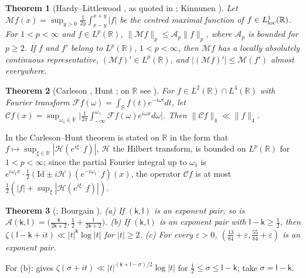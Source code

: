 \documentclass[preprint,12pt]{elsarticle}
\numberwithin{equation}{section}
\theoremstyle{plain}
\newtheorem{theorem}{Theorem}[section]
\theoremstyle{definition}
\theoremstyle{remark}
\newcommand{\R}{\mathbb R}
\begin{document}
\begin{theorem}[Hardy--Littlewood {\cite[Thm.~I.1]{Stein1970}}, as quoted in {\cite[(1.2)]{Kinnunen1997}}; Kinnunen {\cite[Thm.~1.4]{Kinnunen1997}}]\label{thm:known_maximal}
Let $\mathcal Mf(x)=\sup_{y>0}\frac1{2y}\int_{x-y}^{x+y}|f|$ be the centred maximal function of $f\in L^1_{\rm loc}(\R)$. For $1<p<\infty$ and $f\in L^p(\R)$, $\|\mathcal Mf\|_p\le\mathcal A_p\|f\|_p$, where $\mathcal A_p$ is bounded for $p\ge2$. If $f$ and $f'$ belong to $L^p(\R)$, $1<p<\infty$, then $\mathcal Mf$ has a locally absolutely continuous representative, $(\mathcal Mf)'\in L^p(\R)$, and $|(\mathcal Mf)'|\le\mathcal M(f')$ almost everywhere.
\end{theorem}

\begin{theorem}[Carleson {\cite{Carleson1966}}, Hunt {\cite{Hunt1968}}; on $\R$ see {\cite[(1.1) and p.~1]{DiPlinioLerner2014}}]\label{thm:known_carleson}
For $f\in L^2(\R)\cap L^4(\R)$ with Fourier transform $\mathcal Ff(\omega)=\int_\R f(t)e^{-i\omega t}dt$, let $\mathcal Cf(x)=\sup_{\omega_1\in\R}\bigl|\frac1{2\pi}\int_{-\infty}^{\omega_1}\mathcal Ff(\omega)e^{i\omega x}d\omega\bigr|$. Then $\|\mathcal Cf\|_4\ll\|f\|_4$.
\end{theorem}
In \cite[p.~1]{DiPlinioLerner2014} the Carleson--Hunt theorem is stated on $\R$ in the form that $f\mapsto\sup_{\xi\in\R}|\mathcal H(e^{i\xi\cdot}f)|$, $\mathcal H$ the Hilbert transform, is bounded on $L^p(\R)$ for $1<p<\infty$; since the partial Fourier integral up to $\omega_1$ is $e^{i\omega_1x}\cdot\frac12(\mathrm{Id}\pm i\mathcal H)(e^{-i\omega_1\cdot}f)(x)$, the operator $\mathcal Cf$ is at most $\frac12(|f|+\sup_\xi|\mathcal H(e^{i\xi\cdot}f)|)$.

\begin{theorem}[{\cite[Lemma~2.8 and (7.57)]{Ivic1985}}; Bourgain {\cite[\S5, Thm.~6]{Bourgain2017}}]\label{thm:known_exponents}
(a) If $(\mathsf k,\mathsf l)$ is an exponent pair, so is $\mathscr A(\mathsf k,\mathsf l)=\bigl(\frac{\mathsf k}{2\mathsf k+2},\frac12+\frac{\mathsf l}{2\mathsf k+2}\bigr)$. (b) If $(\mathsf k,\mathsf l)$ is an exponent pair with $\mathsf l-\mathsf k\ge\frac12$, then $\zeta(\mathsf l-\mathsf k+it)\ll|t|^{\mathsf k}\log|t|$ for $|t|\ge2$. (c) For every $\varepsilon>0$, $(\frac{13}{84}+\varepsilon,\frac{55}{84}+\varepsilon)$ is an exponent pair.
\end{theorem}
For (b): \cite[(7.57)]{Ivic1985} gives $\zeta(\sigma+it)\ll|t|^{(\mathsf k+\mathsf l-\sigma)/2}\log|t|$ for $\frac12\le\sigma\le\mathsf l-\mathsf k$; take $\sigma=\mathsf l-\mathsf k$.
\end{document}
